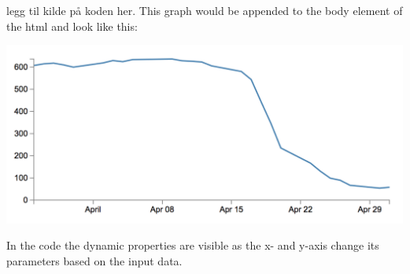 legg til kilde på koden her.
This graph would be appended to the body element of the html and look like this:

\includegraphics[scale=0.5]{graph}

In the code the dynamic properties are visible as the x- and y-axis change its parameters based on the input data. 



